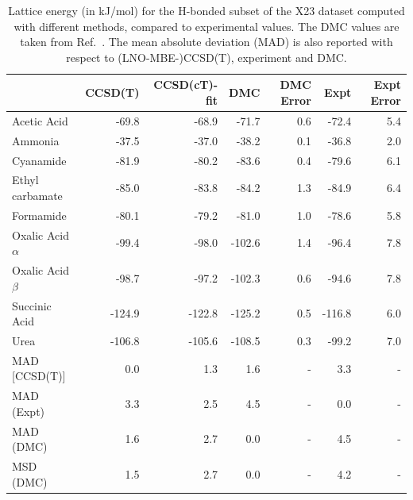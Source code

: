 \begin{table}[h]

\caption{\label{tab:x23_h_bonded_compare}Lattice energy (in kJ/mol) for the H-bonded subset of the X23 dataset computed with different methods, compared to experimental values. The DMC values are taken from Ref.~. The mean absolute deviation (MAD) is also reported with respect to (LNO-MBE-)CCSD(T), experiment and DMC.}
\begin{tabular}{lrrrrrr}
\toprule
 & CCSD(T) & CCSD(cT)-fit & DMC & DMC Error & Expt & Expt Error \\ 
\midrule
Acetic Acid & -69.8 & -68.9 & -71.7 & 0.6 & -72.4 & 5.4 \\
Ammonia & -37.5 & -37.0 & -38.2 & 0.1 & -36.8 & 2.0 \\
Cyanamide & -81.9 & -80.2 & -83.6 & 0.4 & -79.6 & 6.1 \\
Ethyl carbamate & -85.0 & -83.8 & -84.2 & 1.3 & -84.9 & 6.4 \\
Formamide & -80.1 & -79.2 & -81.0 & 1.0 & -78.6 & 5.8 \\
Oxalic Acid $\alpha$ & -99.4 & -98.0 & -102.6 & 1.4 & -96.4 & 7.8 \\
Oxalic Acid $\beta$ & -98.7 & -97.2 & -102.3 & 0.6 & -94.6 & 7.8 \\
Succinic Acid & -124.9 & -122.8 & -125.2 & 0.5 & -116.8 & 6.0 \\
Urea & -106.8 & -105.6 & -108.5 & 0.3 & -99.2 & 7.0 \\
MAD [CCSD(T)] & 0.0 & 1.3 & 1.6 & - & 3.3 & - \\
MAD (Expt) & 3.3 & 2.5 & 4.5 & - & 0.0 & - \\
MAD (DMC) & 1.6 & 2.7 & 0.0 & - & 4.5 & - \\
MSD (DMC) & 1.5 & 2.7 & 0.0 & - & 4.2 & - \\
\bottomrule
\end{tabular}

\end{table}